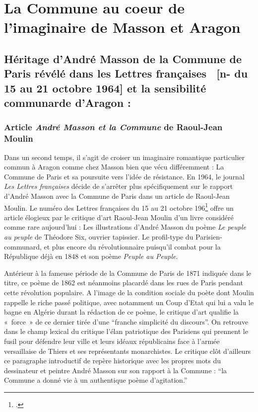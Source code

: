 \chapter{La Commune au coeur de l'imaginaire de Masson et Aragon}

\section{Héritage d’André Masson de la Commune de Paris révélé dans les Lettres françaises  [n- du 15 au 21 octobre 1964] et la sensibilité communarde d’Aragon :}

\subsection{Article \emph{André Masson et la Commune} de Raoul-Jean Moulin }

Dans un second temps, il s’agit de croiser un imaginaire romantique particulier commun à Aragon comme chez Masson bien que vécu différemment : La Commune de Paris et sa poursuite vers l’idée de résistance. En 1964, le journal \emph{Les Lettres françaises} décide de s’arrêter plus spécifiquement sur le rapport d’André Masson avec la Commune de Paris dans un article de Raoul-Jean Moulin. Le numéro des Lettres françaises du 15 au 21 octobre 196\footcite{commune} offre un article élogieux par le critique d’art Raoul-Jean Moulin d’un livre considéré comme rare aujourd’hui : Les illustrations d’André Masson du poème \emph{Le peuple au peuple} de Théodore Six, ouvrier tapissier. Le profil-type du Parisien- communard, et plus encore du révolutionnaire puisqu’il combat pour la République déjà en 1848 et son poème \emph{Peuple au Peuple}. 

 Antérieur à la fameuse période de la Commune de Paris de 1871 indiquée dans le titre, ce poème de 1862 est néanmoins placardé dans les rues de Paris pendant cette révolution populaire. A l’image de la condition sociale du poète dont Moulin rappelle le riche passé politique, avec notamment un Coup d’Etat qui lui a valu le bagne en Algérie durant la rédaction de ce poème, le critique d’art qualifie la « force » de ce dernier tirée d’une \enquote{franche simplicité du discours}. On retrouve dans le champ lexical du critique l’élan patriotique des Parisiens qui prennent le fusil pour défendre leur ville et leurs idéaux républicains face à l’armée versaillaise de Thiers et ses représentants monarchistes. Le critique clôt d’ailleurs ce paragraphe introductif de repère historique avec les propres mots du dessinateur et peintre André Masson sur son rapport à la Commune : \enquote{la Commune a donné vie à un authentique poème d’agitation.}

